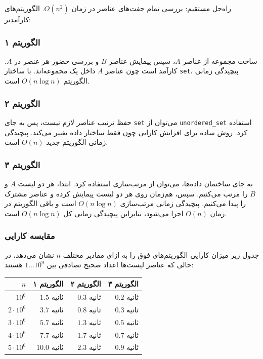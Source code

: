 راه‌حل مستقیم: بررسی تمام جفت‌های عناصر در زمان $O(n^2)$.
الگوریتم‌های کارآمدتر:

\subsubsection{الگوریتم ۱}

ساخت مجموعه از عناصر $A$، سپس پیمایش عناصر $B$ و بررسی حضور هر عنصر در $A$.
کارآمد است چون عناصر $A$ داخل یک مجموعه‌اند.
با ساختار \texttt{set}، پیچیدگی زمانی الگوریتم $O(n \log n)$ است.

\subsubsection{الگوریتم ۲}

حفظ ترتیب عناصر لازم نیست، پس به جای \texttt{set} می‌توان از \texttt{unordered\_set} استفاده کرد.
روش ساده برای افزایش کارایی چون فقط ساختار داده تغییر می‌کند.
پیچیدگی زمانی الگوریتم جدید $O(n)$ است.

\subsubsection{الگوریتم ۳}

به جای ساختمان داده‌ها، می‌توان از مرتب‌سازی استفاده کرد.
ابتدا، هر دو لیست $A$ و $B$ را مرتب می‌کنیم.
سپس، هم‌زمان روی هر دو لیست پیمایش کرده
و عناصر مشترک را پیدا می‌کنیم.
پیچیدگی زمانی مرتب‌سازی $O(n \log n)$ است
و باقی الگوریتم در زمان $O(n)$ اجرا می‌شود،
بنابراین پیچیدگی زمانی کل $O(n \log n)$ است.

\subsubsection{مقایسه کارایی}

جدول زیر میزان کارایی الگوریتم‌های فوق را
به ازای مقادیر مختلف $n$ نشان می‌دهد،
در حالی که عناصر لیست‌ها اعداد صحیح تصادفی
بین $1 \ldots 10^9$ هستند:

\begin{center}
\begin{tabular}{rrrr}
$n$ & الگوریتم ۱ & الگوریتم ۲ & الگوریتم ۳ \\
\hline
$10^6$ & $1.5$ ثانیه & $0.3$ ثانیه & $0.2$ ثانیه \\
$2 \cdot 10^6$ & $3.7$ ثانیه & $0.8$ ثانیه & $0.3$ ثانیه \\
$3 \cdot 10^6$ & $5.7$ ثانیه & $1.3$ ثانیه & $0.5$ ثانیه \\
$4 \cdot 10^6$ & $7.7$ ثانیه & $1.7$ ثانیه & $0.7$ ثانیه \\
$5 \cdot 10^6$ & $10.0$ ثانیه & $2.3$ ثانیه & $0.9$ ثانیه \\
\end{tabular}
\end{center}

